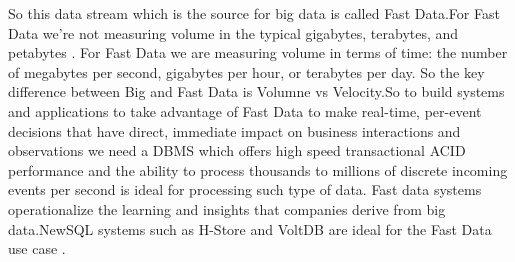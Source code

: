 \documentclass[9pt,twocolumn,twoside]{styles/osajnl}
\begin{document}
So this data stream which is the source for big data is called Fast Data.For Fast Data we're not measuring volume in the typical gigabytes, terabytes, and petabytes . For Fast Data we are measuring volume in terms of time: the number of megabytes per second, gigabytes per hour, or terabytes per day. So the key difference between Big and Fast Data is Volumne vs Velocity.So to build systems and applications to take advantage of Fast Data  to make real-time, per-event decisions that have direct, immediate impact on business interactions and observations we need a DBMS which  offers high speed transactional ACID performance and the ability to process thousands to millions of discrete incoming events per second is ideal for processing such type of data. Fast data systems operationalize the learning and insights that companies derive from big data.NewSQL systems such as H-Store and VoltDB are ideal for the Fast Data use case \cite{www-FastData}.
\end{document}
